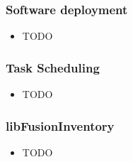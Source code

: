 \begin{frame}
    \frametitle{Software deployment}

    \begin{itemize}
        \item TODO
    \end{itemize}
\end{frame}

\begin{frame}
    \frametitle{Task Scheduling}

    \begin{itemize}
        \item TODO
    \end{itemize}
\end{frame}

\begin{frame}
    \frametitle{libFusionInventory}
    
    \begin{itemize}
        \item TODO
    \end{itemize}
\end{frame}
